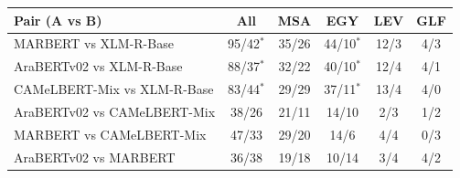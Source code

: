 \begin{tabular}{lccccc}
\toprule
\textbf{Pair (A vs B)} & \textbf{All} & \textbf{MSA} & \textbf{EGY} & \textbf{LEV} & \textbf{GLF} \\
\midrule
MARBERT vs XLM-R-Base & 95/42$^*$ & 35/26 & 44/10$^*$ & 12/3 & 4/3 \\
AraBERTv02 vs XLM-R-Base & 88/37$^*$ & 32/22 & 40/10$^*$ & 12/4 & 4/1 \\
CAMeLBERT-Mix vs XLM-R-Base & 83/44$^*$ & 29/29 & 37/11$^*$ & 13/4 & 4/0 \\
AraBERTv02 vs CAMeLBERT-Mix & 38/26 & 21/11 & 14/10 & 2/3 & 1/2 \\
MARBERT vs CAMeLBERT-Mix & 47/33 & 29/20 & 14/6 & 4/4 & 0/3 \\
AraBERTv02 vs MARBERT & 36/38 & 19/18 & 10/14 & 3/4 & 4/2 \\
\bottomrule
\end{tabular}
